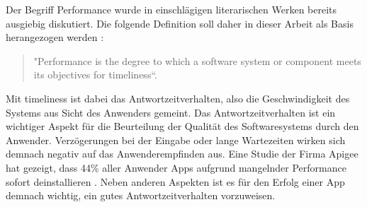 Der Begriff Performance wurde in einschlägigen literarischen Werken bereits ausgiebig diskutiert. Die folgende Definition soll daher in dieser Arbeit als Basis herangezogen werden \cite{Smith2001}: 
\begin{quote}
"Performance is the degree to which a software system or component meets its objectives for timeliness“. 
\end{quote}
Mit \glqq timeliness\grqq{} ist dabei das Antwortzeitverhalten, also die Geschwindigkeit des Systems aus Sicht des Anwenders gemeint. Das Antwortzeitverhalten ist ein wichtiger Aspekt für die Beurteilung der Qualität des Softwaresystems durch den Anwender. Verzögerungen bei der Eingabe oder lange Wartezeiten wirken sich demnach negativ auf das Anwenderempfinden aus. Eine Studie der Firma Apigee hat gezeigt, dass 44\% aller Anwender Apps aufgrund mangelnder Performance sofort deinstallieren \cite{APIGEE}. Neben anderen Aspekten ist es für den Erfolg einer App demnach wichtig, ein gutes Antwortzeitverhalten vorzuweisen.

